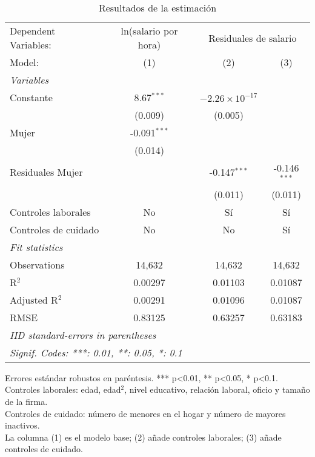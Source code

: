 
\begin{table}[htbp]
   \caption{Resultados de la estimación}
   \centering
   \begin{tabular}{lccc}
      \tabularnewline \midrule \midrule
      Dependent Variables: & ln(salario por hora) & \multicolumn{2}{c}{Residuales de salario}\\
      Model:               & (1)            & (2)                     & (3)\\  
      \midrule
      \emph{Variables}\\
      Constante            & 8.67$^{***}$   & $-2.26\times 10^{-17}$  &   \\   
                           & (0.009)        & (0.005)                 &   \\   
      Mujer                & -0.091$^{***}$ &                         &   \\   
                           & (0.014)        &                         &   \\   
      Residuales Mujer     &                & -0.147$^{***}$          & -0.146$^{***}$\\   
                           &                & (0.011)                 & (0.011)\\   
      Controles laborales  & No             & Sí                      & Sí\\  
      Controles de cuidado & No             & No                      & Sí\\  
      \midrule
      \emph{Fit statistics}\\
      Observations         & 14,632         & 14,632                  & 14,632\\  
      R$^2$                & 0.00297        & 0.01103                 & 0.01087\\  
      Adjusted R$^2$       & 0.00291        & 0.01096                 & 0.01087\\  
      RMSE                 & 0.83125        & 0.63257                 & 0.63183\\  
      \midrule \midrule
      \multicolumn{4}{l}{\emph{IID standard-errors in parentheses}}\\
      \multicolumn{4}{l}{\emph{Signif. Codes: ***: 0.01, **: 0.05, *: 0.1}}\\
   \end{tabular}
   
   \par \raggedright 
   Errores estándar robustos en paréntesis. *** p<0.01, ** p<0.05, * p<0.1.\\
   Controles laborales: edad, edad$^2$, nivel educativo, relación laboral, oficio y tamaño de la firma.\\
   Controles de cuidado: número de menores en el hogar y número de mayores inactivos.\\
   La columna (1) es el modelo base; (2) añade controles laborales; (3) añade controles de cuidado.
\end{table}



